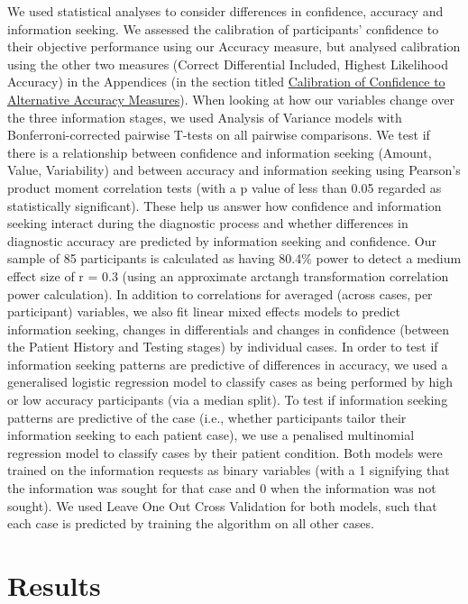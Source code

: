 \documentclass[a4paper, nobind]{templates/ociamthesis}
\begin{document}
\hfill\break
We used statistical analyses to consider differences in confidence, accuracy and information seeking. We assessed the calibration of participants' confidence to their objective performance using our Accuracy measure, but analysed calibration using the other two measures (Correct Differential Included, Highest Likelihood Accuracy) in the Appendices (in the section titled \hyperref[calibrations]{Calibration of Confidence to Alternative Accuracy Measures}). When looking at how our variables change over the three information stages, we used Analysis of Variance models with Bonferroni-corrected pairwise T-tests on all pairwise comparisons. We test if there is a relationship between confidence and information seeking (Amount, Value, Variability) and between accuracy and information seeking using Pearson's product moment correlation tests (with a p value of less than 0.05 regarded as statistically significant). These help us answer how confidence and information seeking interact during the diagnostic process and whether differences in diagnostic accuracy are predicted by information seeking and confidence. Our sample of 85 participants is calculated as having 80.4\% power to detect a medium effect size of r = 0.3 (using an approximate arctangh transformation correlation power calculation). In addition to correlations for averaged (across cases, per participant) variables, we also fit linear mixed effects models to predict information seeking, changes in differentials and changes in confidence (between the Patient History and Testing stages) by individual cases. In order to test if information seeking patterns are predictive of differences in accuracy, we used a generalised logistic regression model to classify cases as being performed by high or low accuracy participants (via a median split). To test if information seeking patterns are predictive of the case (i.e., whether participants tailor their information seeking to each patient case), we use a penalised multinomial regression model to classify cases by their patient condition. Both models were trained on the information requests as binary variables (with a 1 signifying that the information was sought for that case and 0 when the information was not sought). We used Leave One Out Cross Validation for both models, such that each case is predicted by training the algorithm on all other cases.

\section{Results}\label{results-1}
\end{document}
